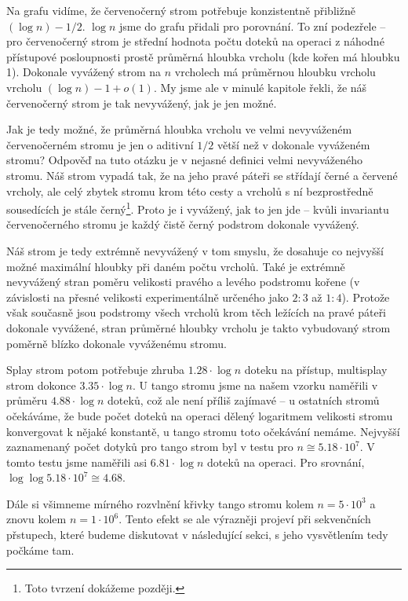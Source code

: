 Na grafu vidíme, že červenočerný strom potřebuje konzistentně přibližně $(\log
n) - 1/2$. $\log n$ jsme do grafu přidali pro porovnání. To zní podezřele --
pro červenočerný strom je střední hodnota počtu doteků na operaci z náhodné
přístupové posloupnosti prostě průměrná hloubka vrcholu (kde kořen má hloubku
1). Dokonale vyvážený strom na $n$ vrcholech má průměrnou hloubku vrcholu
vrcholu $(\log n) - 1 + o(1)$. My jsme ale v minulé kapitole řekli, že náš
červenočerný strom je tak nevyvážený, jak je jen možné.

Jak je tedy možné, že průměrná hloubka vrcholu ve velmi nevyváženém
červenočerném stromu je jen o aditivní $1/2$ větší než v dokonale vyváženém
stromu? Odpověď na tuto otázku je v nejasné definici velmi nevyváženého stromu.
Náš strom vypadá tak, že na jeho pravé páteři se střídají černé a červené
vrcholy, ale celý zbytek stromu krom této cesty a vrcholů s ní bezprostředně
sousedících je stále černý\footnote{Toto tvrzení dokážeme později.}. Proto je i vyvážený, jak to jen jde -- kvůli
invariantu červenočerného stromu je každý čistě černý podstrom dokonale
vyvážený.

Náš strom je
tedy extrémně nevyvážený v tom smyslu, že dosahuje co nejvyšší možné maximální
hloubky při daném počtu vrcholů. Také je extrémně nevyvážený stran poměru
velikosti pravého a levého podstromu kořene (v závislosti na přesné velikosti
experimentálně určeného jako $2:3$ až $1:4$). Protože však současně jsou
podstromy všech vrcholů krom těch ležících na pravé páteři dokonale
vyvážené, stran průměrné hloubky vrcholu je takto vybudovaný strom poměrně
blízko dokonale vyváženému stromu.


Splay strom potom potřebuje zhruba $1.28\cdot \log n$ doteku na přístup, multisplay strom
dokonce $3.35\cdot \log n$. U tango stromu jsme na našem vzorku naměřili v
průměru $4.88\cdot \log n$ doteků, což ale není příliš zajímavé -- u ostatních
stromů očekáváme, že bude počet doteků na operaci dělený logaritmem velikosti stromu konvergovat
k nějaké konstantě, u tango stromu toto očekávání nemáme. Nejvyšší zaznamenaný
počet dotyků pro tango strom byl v testu pro $n \cong 5.18\cdot 10^7$. V tomto
testu jsme naměřili asi $6.81\cdot \log n$ doteků na operaci. Pro srovnání,
$\log\log 5.18\cdot 10^7 \cong 4.68$. 

Dále si všimneme mírného rozvlnění křivky tango stromu kolem $n=5\cdot 10^3$ a
znovu kolem $n=1\cdot 10^6$. Tento efekt se ale výrazněji projeví při
sekvenčních přstupech, které budeme diskutovat v následující sekci, s jeho
vysvětlením tedy počkáme tam.

